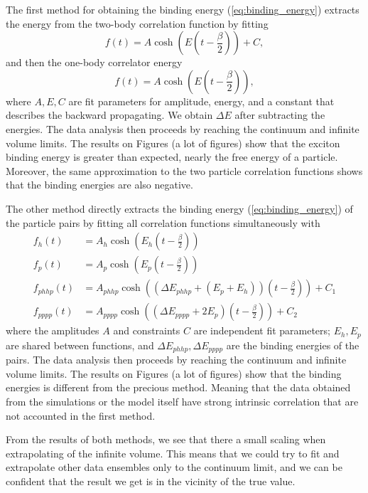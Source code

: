 The first method for obtaining the binding energy (\ref{eq:binding_energy}) extracts the energy from the two-body correlation function by fitting
\begin{equation}
    f(t) = A\cosh(E(t-\frac{\beta}{2})) + C,
\end{equation}
and then the one-body correlator energy
\begin{equation}
    f(t) = A\cosh(E(t-\frac{\beta}{2})),
\end{equation}
where $A, E, C$ are fit parameters for amplitude, energy, and a constant that describes the backward propagating. We obtain $\Delta E$ after subtracting the energies. The data analysis then proceeds by reaching the continuum and infinite volume limits. The results on Figures (a lot of figures) show that the exciton binding energy is greater than expected, nearly the free energy of a particle. Moreover, the same approximation to the two particle correlation functions shows that the binding energies are also negative.

The other method directly extracts the binding energy (\ref{eq:binding_energy}) of the particle pairs by fitting all correlation functions simultaneously with
\begin{equation}
    \begin{aligned}
        f_h(t) &= A_h\cosh(E_h(t-\frac{\beta}{2})) \\
        f_p(t) &= A_p\cosh(E_p(t-\frac{\beta}{2})) \\
        f_{phhp}(t) &= A_{phhp}\cosh((\Delta E_{phhp}+(E_p+E_h))(t-\frac{\beta}{2})) + C_1 \\
        f_{pppp}(t) &= A_{pppp}\cosh((\Delta E_{pppp}+2E_p)(t-\frac{\beta}{2})) + C_2
    \end{aligned}    
\end{equation}
where the amplitudes $A$ and constraints $C$ are independent fit parameters; $E_h, E_p$ are shared between functions, and $\Delta E_{phhp}, \Delta E_{pppp}$ are the binding energies of the pairs. The data analysis then proceeds by reaching the continuum and infinite volume limits. The results on Figures (a lot of figures) show that the binding energies is different from the precious method. Meaning that the data obtained from the simulations or the model itself have strong intrinsic correlation that are not accounted in the first method.

From the results of both methods, we see that there a small scaling when extrapolating of the infinite volume. This means that we could try to fit and extrapolate other data ensembles only to the continuum limit, and we can be confident that the result we get is in the vicinity of the true value.

